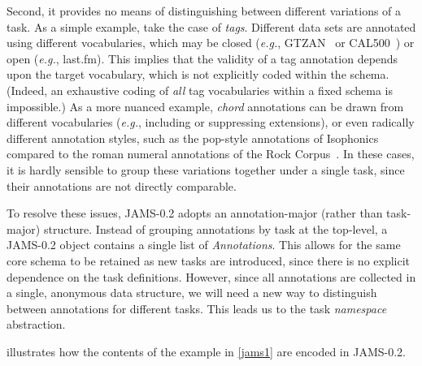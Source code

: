 \documentclass{article}
\begin{document}
Second, it provides no means of distinguishing between different variations of a task.
As a simple example, take the case of \emph{tags}.
Different data sets are annotated using different vocabularies, which may be closed
(\emph{e.g.}, GTZAN~\cite{gtzan} or CAL500~\cite{cal500}) or open (\emph{e.g.}, last.fm).
This implies that the validity of a tag annotation depends upon the target vocabulary, which is not explicitly coded within the schema.
(Indeed, an exhaustive coding of \emph{all} tag vocabularies within a fixed schema is impossible.) 
As a more nuanced example, \emph{chord} annotations can be drawn from different vocabularies (\emph{e.g.}, including or suppressing extensions),
or even radically different annotation styles, such as the pop-style annotations of
Isophonics~\cite{isophonicsbeatles} compared to the roman numeral annotations of the
Rock Corpus~\cite{de2011corpus}.
In these cases, it is hardly sensible to group these variations together under a single task, since their annotations are not directly
comparable.

To resolve these issues, JAMS-0.2 adopts an an\-notation-major (rather than task-major) structure.
Instead of grouping annotations by task at the top-level, a JAMS-0.2 object contains a single list of \emph{Annotations}.
This allows for the same core schema to be retained as new tasks are introduced, since there is no explicit dependence on the task
definitions.
However, since all annotations are collected in a single, anonymous data structure, we will need a new way to distinguish between annotations for different tasks.
This leads us to the task \emph{namespace} abstraction.

 illustrates how the contents of the example in \cref{jams1} are encoded in
JAMS-0.2.
\end{document}

